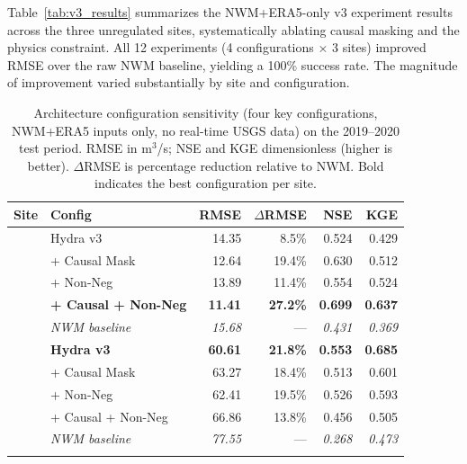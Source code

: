 \documentclass[draft]{agujournal2019}
\begin{document}
Table~\ref{tab:v3_results} summarizes the NWM+ERA5-only v3 experiment results across the three unregulated sites, systematically ablating causal masking and the physics constraint. All 12 experiments (4 configurations $\times$ 3 sites) improved RMSE over the raw NWM baseline, yielding a 100\% success rate. The magnitude of improvement varied substantially by site and configuration.

\begin{table}
    \centering
    \caption{Architecture configuration sensitivity (four key configurations, NWM+ERA5 inputs only, no real-time USGS data) on the 2019--2020 test period. RMSE in m$^3$/s; NSE and KGE dimensionless (higher is better). $\Delta$RMSE is percentage reduction relative to NWM. Bold indicates the best configuration per site.}
    \small
    \begin{tabular}{ll rr rr}
        \toprule
        \textbf{Site} & \textbf{Config} & \textbf{RMSE} & \textbf{$\Delta$RMSE} & \textbf{NSE} & \textbf{KGE} \\
        \midrule
            & Hydra v3 & 14.35 & 8.5\% & 0.524 & 0.429 \\
            & + Causal Mask & 12.64 & 19.4\% & 0.630 & 0.512 \\
            & + Non-Neg & 13.89 & 11.4\% & 0.554 & 0.524 \\
            & \textbf{+ Causal + Non-Neg} & \textbf{11.41} & \textbf{27.2\%} & \textbf{0.699} & \textbf{0.637} \\
            & \textit{NWM baseline} & \textit{15.68} & --- & \textit{0.431} & \textit{0.369} \\
        \midrule
            & \textbf{Hydra v3} & \textbf{60.61} & \textbf{21.8\%} & \textbf{0.553} & \textbf{0.685} \\
            & + Causal Mask & 63.27 & 18.4\% & 0.513 & 0.601 \\
            & + Non-Neg & 62.41 & 19.5\% & 0.526 & 0.593 \\
            & + Causal + Non-Neg & 66.86 & 13.8\% & 0.456 & 0.505 \\
            & \textit{NWM baseline} & \textit{77.55} & --- & \textit{0.268} & \textit{0.473} \\
        \midrule

\end{tabular}
\end{table}
\end{document}
